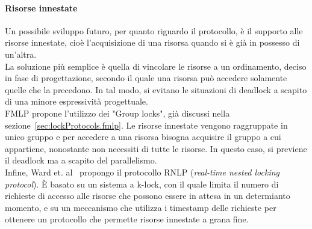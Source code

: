 \paragraph{Risorse innestate}

Un possibile sviluppo futuro, per quanto riguardo il protocollo, è il supporto alle risorse innestate, cioè l'acquisizione di una risorsa quando si è già in possesso di un'altra.\\
La soluzione più semplice è quella di vincolare le risorse a un ordinamento, deciso in fase di progettazione, secondo il quale una risorsa può accedere solamente quelle che la precedono. In tal modo, si evitano le situazioni di deadlock a scapito di una minore espressività progettuale.\\
FMLP propone l'utilizzo dei "Group locks", già discussi nella sezione~\ref{sec:lockProtocols.fmlp}. Le risorse innestate vengono raggruppate in unico gruppo e per accedere a una risorsa bisogna acquisire il gruppo a cui appartiene, nonostante non necessiti di tutte le risorse. In questo caso, si previene il deadlock ma a scapito del parallelismo.\\
Infine, Ward et. al~\cite{DBLP:dblp_conf/ecrts/WardA12} propongo il protocollo RNLP (\textit{real-time nested locking protocol}). \`E basato su un sistema a k-lock, con il quale limita il numero di richieste di accesso alle risorse che possono essere in attesa in un determianto momento, e su un meccanismo che utilizza i timestamp delle richieste per ottenere un protocollo che permette risorse innestate a grana fine.